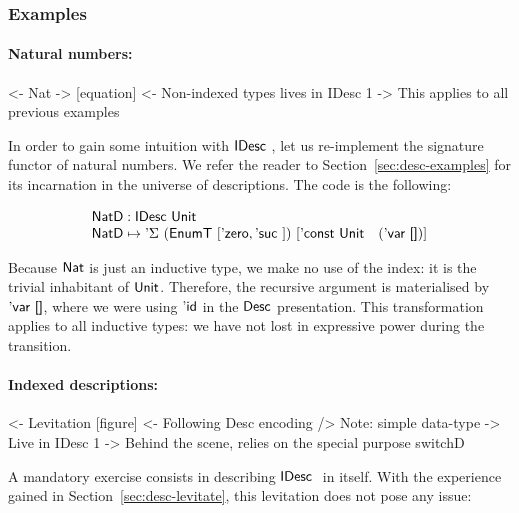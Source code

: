 

\subsubsection{Examples}
\label{sec:idesc-examples}

\paragraph{Natural numbers:}

\begin{wstructure}
<- Nat
    -> [equation]
    <- Non-indexed types lives in IDesc 1
        -> This applies to all previous examples
\end{wstructure}

In order to gain some intuition with $\IDesc$, let us re-implement the
signature functor of natural numbers. We refer the reader to
Section~\ref{sec:desc-examples} for its incarnation in the universe of
descriptions. The code is the following:

\[\stk{
\NatD : \IDesc{\Unit} \\
\NatD \mapsto \DSigma{(\EnumT{[ \NatZero, \NatSuc{} ]})}
                     {[ \DConst{\Unit} \quad (\DVar{\Void}) ]}
}\]

Because $\Nat$ is just an inductive type, we make no use of the index:
it is the trivial inhabitant of $\Unit$. Therefore, the recursive
argument is materialised by $\DVar{\Void}$, where we were using $\DId$
in the $\Desc$ presentation. This transformation applies to all
inductive types: we have not lost in expressive power during the
transition.

\paragraph{Indexed descriptions:}

\begin{wstructure}
<- Levitation [figure]
    <- Following Desc encoding
        /> Note: simple data-type
            -> Live in IDesc 1
    -> Behind the scene, relies on the special purpose switchD
\end{wstructure}

A mandatory exercise consists in describing $\IDesc$ in itself. With
the experience gained in Section~\ref{sec:desc-levitate}, this
levitation does not pose any issue:

